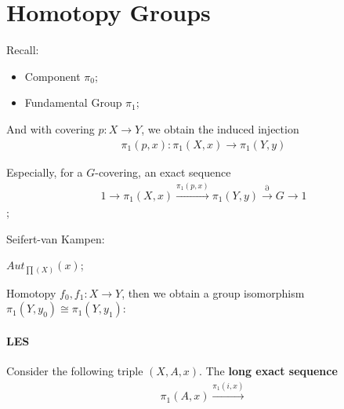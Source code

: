 \documentclass[Total.tex]{subfiles}
\begin{document}
	\chapter{Homotopy Groups}
		Recall:
		\begin{itemize}
			\item Component $\pi_0$;
			\item Fundamental Group $\pi_1$;
		\end{itemize}
		
		And with covering $p:X\rightarrow Y$, we obtain the induced injection
		\begin{gather*}
			\pi_1(p,x):\pi_1(X,x)\rightarrow \pi_1(Y,y)
		\end{gather*}
		
		
		Especially, for a $G$-covering, an exact sequence
		\begin{gather*}
			1\rightarrow \pi_1(X,x)\stackrel{\pi_1(p,x)}{\rightarrow} \pi_1(Y,y) \stackrel{\partial}{\rightarrow} G\rightarrow 1
		\end{gather*};
		
		Seifert-van Kampen: 
		
		$Aut_{\prod(X)}(x)$;
		
		Homotopy $f_0,f_1:X\rightarrow Y$, then we obtain a group isomorphism $\pi_1(Y,y_0)\cong \pi_1(Y,y_1)$:
		\begin{center}
		\end{center}
		
		\subsubsection{LES}
		
		Consider the following triple $(X,A,x)$. The \textbf{long exact sequence}
		\begin{gather*}
			\pi_1(A,x)\stackrel{\pi_1(i,x)}{\rightarrow} 
		\end{gather*}
\end{document}
